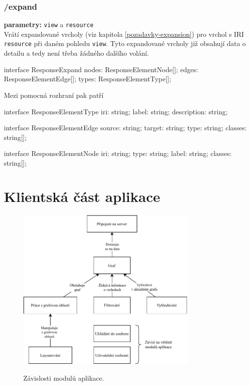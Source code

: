 \subsubsection{/expand}
\textbf{parametry:} \texttt{view} a \texttt{resource} \\
Vrátí expandované vrcholy (viz kapitola \ref{pozadavky-expansion}) pro vrchol s IRI \texttt{resource} při daném pohledu \texttt{view}. Tyto expandované vrcholy již obsahují data o detailu a tedy není třeba žádného dalšího volání.

\begin{code}
interface ResponseExpand {
    nodes: ResponseElementNode[];
    edges: ResponseElementEdge[];
    types: ResponseElementType[];
}
\end{code}

\newpage

Mezi pomocná rozhraní pak patří
\begin{code}
interface ResponseElementType {
    iri: string;
    label: string;
    description: string;
}

interface ResponseElementEdge {
    source: string;
    target: string;
    type: string;
    classes: string[];
}

interface ResponseElementNode {
    iri: string;
    type: string;
    label: string;
    classes: string[];
}
\end{code}

\newpage

\section{Klientská část aplikace}

\begin{figure}[h]
    \centering
    \includegraphics[width=0.8\textwidth]{media/module-dependencies.pdf}
    \label{fig:module-dependencies}
    \caption{Závislosti modulů aplikace.}
\end{figure}

